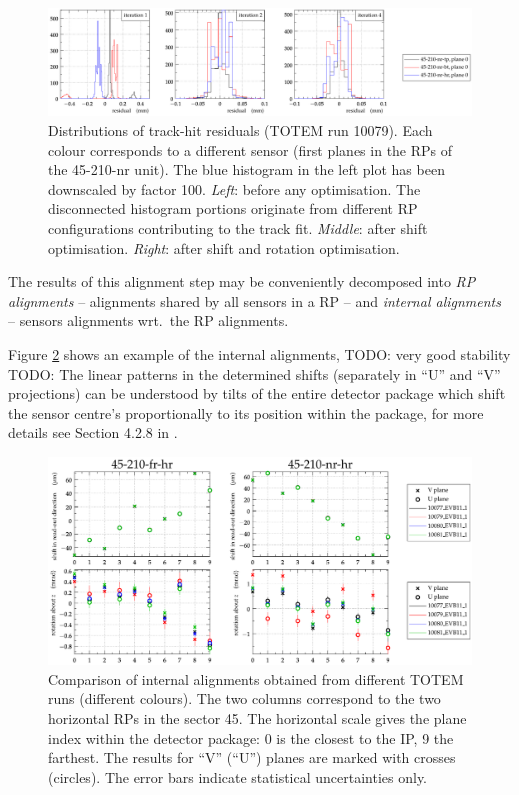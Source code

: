 \documentclass[TOTEM]{cern/cernphprep}
\begin{document}
\begin{figure}[h!]
\begin{center}
\includegraphics[width=\hsize]{fig/calibration_fill/residuals.pdf}
\caption{%
Distributions of track-hit residuals (TOTEM run 10079). Each colour corresponds to a different sensor (first planes in the RPs of the 45-210-nr unit). The blue histogram in the left plot has been downscaled by factor 100. {\it Left}: before any optimisation. The disconnected histogram portions originate from different RP configurations contributing to the track fit. {\it Middle}: after shift optimisation. {\it Right}: after shift and rotation optimisation.
}
\label{fig:tb_residuals}
\end{center}
\end{figure}

The results of this alignment step may be conveniently decomposed into {\em RP alignments} -- alignments shared by all sensors in a RP -- and {\em internal alignments} -- sensors alignments wrt.~the RP alignments.

Figure \ref{fig:tb_example_internal} shows an example of the internal alignments, TODO: very good stability
TODO: The linear patterns in the determined shifts (separately in ``U'' and ``V'' projections) can be understood by tilts of the entire detector package which shift the sensor centre's proportionally to its position within the package, for more details see Section 4.2.8 in \cite{jan_thesis}.

\begin{figure}[h!]
\begin{center}
\includegraphics[width=0.8\hsize]{fig/calibration_fill/plots_per_plane_left.pdf}
\caption{%
Comparison of internal alignments obtained from different TOTEM runs (different colours). The two columns correspond to the two horizontal RPs in the sector 45. The horizontal scale gives the plane index within the detector package: 0 is the closest to the IP, 9 the farthest. The results for ``V'' (``U'') planes are marked with crosses (circles). The error bars indicate statistical uncertainties only.
}
\label{fig:tb_example_internal}
\end{center}
\end{figure}
\end{document}
